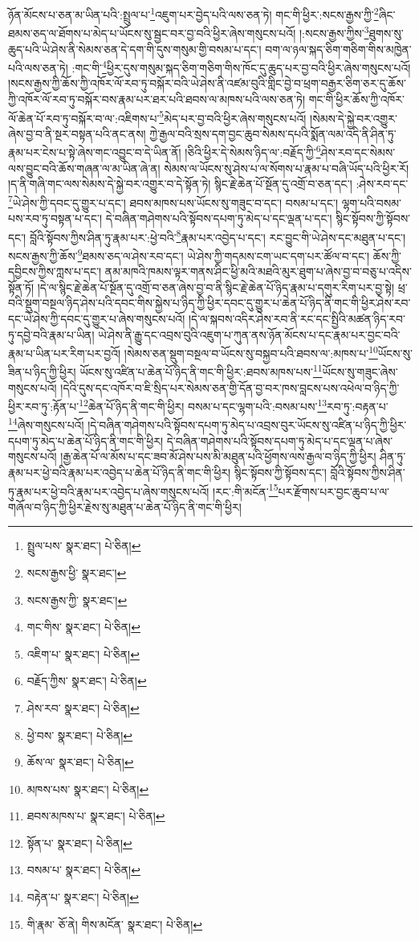 ཉོན་མོངས་པ་ཅན་མ་ཡིན་པའི་:སྤྲུལ་པ་\footnote{སྤྲུལ་པས་  སྣར་ཐང་།  པེ་ཅིན། }འཇུག་པར་བྱེད་པའི་ལས་ཅན་ཏེ། གང་གི་ཕྱིར་:སངས་རྒྱས་ཀྱི་\footnote{སངས་རྒྱས་ཕྱི་  སྣར་ཐང་། }ཞིང་ཐམས་ཅད་ལ་ཐོགས་པ་མེད་པ་ཡོངས་སུ་སྦྱང་བར་བྱ་བའི་ཕྱིར་ཞེས་གསུངས་པའོ། །:སངས་རྒྱས་ཀྱིས་\footnote{སངས་རྒྱས་ཀྱི་  སྣར་ཐང་། }ཐུགས་སུ་ཆུད་པའི་ཡེ་ཤེས་ནི་སེམས་ཅན་དེ་དག་གི་དུས་གསུམ་གྱི་བསམ་པ་དང་། བག་ལ་ཉལ་སྐད་ཅིག་གཅིག་གིས་མཁྱེན་པའི་ལས་ཅན་ཏེ། :གང་གི་\footnote{གང་གིས་  སྣར་ཐང་།  པེ་ཅིན། }ཕྱིར་དུས་གསུམ་སྐད་ཅིག་གཅིག་གིས་ཁོང་དུ་ཆུད་པར་བྱ་བའི་ཕྱིར་ཞེས་གསུངས་པའོ། །སངས་རྒྱས་ཀྱི་ཆོས་ཀྱི་འཁོར་ལོ་རབ་ཏུ་བསྐོར་བའི་ཡེ་ཤེས་ནི་འཛམ་བུའི་གླིང་བྱེ་བ་ཕྲག་བརྒྱར་ཅིག་ཅར་དུ་ཆོས་ཀྱི་འཁོར་ལོ་རབ་ཏུ་བསྐོར་བས་རྣམ་པར་ཐར་པའི་ཐབས་ལ་མཁས་པའི་ལས་ཅན་ཏེ། གང་གི་ཕྱིར་ཆོས་ཀྱི་འཁོར་ལོ་ཆེན་པོ་རབ་ཏུ་བསྐོར་བ་ལ་:འཇིགས་པ་\footnote{འཇིག་པ་  སྣར་ཐང་།  པེ་ཅིན། }མེད་པར་བྱ་བའི་ཕྱིར་ཞེས་གསུངས་པའོ། །སེམས་དེ་སྐྱེ་བར་འགྱུར་ཞེས་བྱ་བ་ནི་སྔར་བསྟན་པའི་ནང་ནས། ཀྱེ་རྒྱལ་བའི་སྲས་དག་བྱང་ཆུབ་སེམས་དཔའི་སྨོན་ལམ་འདི་ནི་ཤིན་ཏུ་རྣམ་པར་ངེས་པ་སྟེ་ཞེས་གང་འབྱུང་བ་དེ་ཡིན་ནོ། །ཅིའི་ཕྱིར་དེ་སེམས་ཉིད་ལ་:བརྗོད་ཀྱི་\footnote{བརྗོད་ཀྱིས་  སྣར་ཐང་།  པེ་ཅིན། }ཤེས་རབ་དང་སེམས་ལས་བྱུང་བའི་ཆོས་གཞན་ལ་མ་ཡིན་ཞེ་ན། སེམས་ལ་ཡོངས་སུ་ཤེས་པ་ལ་སོགས་པ་རྣམ་པ་བཞི་ཡོད་པའི་ཕྱིར་རོ། །ད་ནི་གཞི་གང་ལས་སེམས་དེ་སྐྱེ་བར་འགྱུར་བ་དེ་སྟོན་ཏེ། སྙིང་རྗེ་ཆེན་པོ་སྔོན་དུ་འགྲོ་བ་ཅན་དང་། :ཤེས་རབ་དང་\footnote{ཤེས་རབ་  སྣར་ཐང་།  པེ་ཅིན། }ཡེ་ཤེས་ཀྱི་དབང་དུ་གྱུར་པ་དང་། ཐབས་མཁས་པས་ཡོངས་སུ་གཟུང་བ་དང་། བསམ་པ་དང་། ལྷག་པའི་བསམ་པས་རབ་ཏུ་བསྟན་པ་དང་། དེ་བཞིན་གཤེགས་པའི་སྟོབས་དཔག་ཏུ་མེད་པ་དང་ལྡན་པ་དང་། སྙིང་སྟོབས་ཀྱི་སྟོབས་དང་། བློའི་སྟོབས་ཀྱིས་ཤིན་ཏུ་རྣམ་པར་:ཕྱེ་བའི་\footnote{ཕྱེ་བས་  སྣར་ཐང་།  པེ་ཅིན། }རྣམ་པར་འབྱེད་པ་དང་། རང་བྱུང་གི་ཡེ་ཤེས་དང་མཐུན་པ་དང་། སངས་རྒྱས་ཀྱི་ཆོས་\footnote{ཆོས་ལ་  སྣར་ཐང་།  པེ་ཅིན། }ཐམས་ཅད་ལ་ཤེས་རབ་དང་། ཡེ་ཤེས་ཀྱི་གདམས་ངག་ཡང་དག་པར་ཚོལ་བ་དང་། ཆོས་ཀྱི་དབྱིངས་ཀྱིས་ཀླས་པ་དང་། ནམ་མཁའི་ཁམས་ལྟར་གནས་ཤིང་ཕྱི་མའི་མཐའི་མུར་ཐུག་པ་ཞེས་བྱ་བ་བཅུ་པ་འདིས་སྟོན་ཏོ། །དེ་ལ་སྙིང་རྗེ་ཆེན་པོ་སྔོན་དུ་འགྲོ་བ་ཅན་ཞེས་བྱ་བ་ནི་སྙིང་རྗེ་ཆེན་པོ་ཉིད་རྣམ་པ་དགུར་རིག་པར་བྱ་སྟེ། ཕྲ་བའི་སྡུག་བསྔལ་ཉིད་ཤེས་པའི་དབང་གིས་སྐྱེས་པ་ཉིད་ཀྱི་ཕྱིར་དབང་དུ་གྱུར་པ་ཆེན་པོ་ཉིད་ནི་གང་གི་ཕྱིར་ཤེས་རབ་དང་ཡེ་ཤེས་ཀྱི་དབང་དུ་གྱུར་པ་ཞེས་གསུངས་པའོ། །དེ་ལ་སྐབས་འདིར་ཤེས་རབ་ནི་རང་དང་སྤྱིའི་མཚན་ཉིད་རབ་ཏུ་དབྱེ་བའི་རྣམ་པ་ཡིན། ཡེ་ཤེས་ནི་རྒྱུ་དང་འབྲས་བུའི་འཇུག་པ་ཀུན་ནས་ཉོན་མོངས་པ་དང་རྣམ་པར་བྱང་བའི་རྣམ་པ་ཡིན་པར་རིག་པར་བྱའོ། །སེམས་ཅན་སྡུག་བསྔལ་བ་ཡོངས་སུ་བསྐྱབ་པའི་ཐབས་ལ་:མཁས་པ་\footnote{མཁས་པས་  སྣར་ཐང་།  པེ་ཅིན། }ཡོངས་སུ་ཟིན་པ་ཉིད་ཀྱི་ཕྱིར། ཡོངས་སུ་འཛིན་པ་ཆེན་པོ་ཉིད་ནི་གང་གི་ཕྱིར་:ཐབས་མཁས་པས་\footnote{ཐབས་མཁས་པ་  སྣར་ཐང་།  པེ་ཅིན། }ཡོངས་སུ་གཟུང་ཞེས་གསུངས་པའོ། །དེའི་དུས་དང་འཁོར་བ་ཇི་སྲིད་པར་སེམས་ཅན་གྱི་དོན་བྱ་བར་ཁས་བླངས་པས་འཕེལ་བ་ཉིད་ཀྱི་ཕྱིར་རབ་ཏུ་:རྟོན་པ་\footnote{སྟོན་པ་  སྣར་ཐང་།  པེ་ཅིན། }ཆེན་པོ་ཉིད་ནི་གང་གི་ཕྱིར། བསམ་པ་དང་ལྷག་པའི་:བསམ་པས་\footnote{བསམ་པ་  སྣར་ཐང་།  པེ་ཅིན། }རབ་ཏུ་:བརྟན་པ་\footnote{བརྟེན་པ་  སྣར་ཐང་།  པེ་ཅིན། }ཞེས་གསུངས་པའོ། །དེ་བཞིན་གཤེགས་པའི་སྟོབས་དཔག་ཏུ་མེད་པ་འབྲས་བུར་ཡོངས་སུ་འཛིན་པ་ཉིད་ཀྱི་ཕྱིར་དཔག་ཏུ་མེད་པ་ཆེན་པོ་ཉིད་ནི་གང་གི་ཕྱིར། དེ་བཞིན་གཤེགས་པའི་སྟོབས་དཔག་ཏུ་མེད་པ་དང་ལྡན་པ་ཞེས་གསུངས་པའོ། །རྒྱ་ཆེན་པོ་ལ་མོས་པ་དང་ཟབ་མོ་ཤེས་པས་མི་མཐུན་པའི་ཕྱོགས་ལས་རྒྱལ་བ་ཉིད་ཀྱི་ཕྱིར། ཤིན་ཏུ་རྣམ་པར་ཕྱེ་བའི་རྣམ་པར་འབྱེད་པ་ཆེན་པོ་ཉིད་ནི་གང་གི་ཕྱིར། སྙིང་སྟོབས་ཀྱི་སྟོབས་དང་། བློའི་སྟོབས་ཀྱིས་ཤིན་ཏུ་རྣམ་པར་ཕྱེ་བའི་རྣམ་པར་འབྱེད་པ་ཞེས་གསུངས་པའོ། །རང་:གི་མངོན་\footnote{གི་རྣམ་  ཅོ་ནེ། གིས་མངོན་  སྣར་ཐང་།  པེ་ཅིན། }པར་རྫོགས་པར་བྱང་ཆུབ་པ་ལ་གཞོལ་བ་ཉིད་ཀྱི་ཕྱིར་རྗེས་སུ་མཐུན་པ་ཆེན་པོ་ཉིད་ནི་གང་གི་ཕྱིར། 